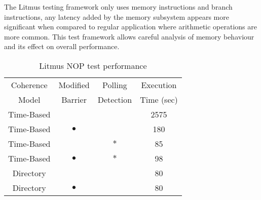 		The Litmus testing framework only uses memory instructions and branch instructions, any latency added by the memory subsystem appears more significant when compared to regular application where arithmetic operations are more common. This test framework allows careful analysis of memory behaviour and its effect on overall performance.

		\begin{table} %
		\begin{center}
		\begin{tabular}{|c|c|c|c|}
		\hline
		Coherence & Modified & Polling & Execution \\
		Model & Barrier & Detection & Time (sec) \\
		\hline
		Time-Based & & & 2575 \\
		Time-Based & $\bullet$ & & 180 \\
		Time-Based & & $\ast$ & 85 \\
		Time-Based & $\bullet$ & $\ast$ & 98 \\
		Directory &  & & 80 \\
		Directory & $\bullet$ & & 80 \\
		\hline
		\end{tabular}
		\caption{Litmus NOP test performance}
		\label{litmus_nop_performance}
		\end{center} 
		\end{table}	


